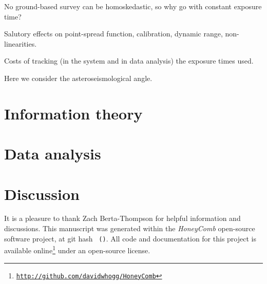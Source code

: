 \documentclass[12pt, preprint]{aastex}
\newcommand{\giturl}{\url{http://github.com/davidwhogg/HoneyComb}}
\newcommand{\project}[1]{\textsl{#1}}
\begin{document}
No ground-based survey can be homoskedastic, so why go with constant exposure time?

Salutory effects on point-spread function, calibration, dynamic range, non-linearities.

Costs of tracking (in the system and in data analysis) the exposure times used.

Here we consider the asteroseismological angle.

\section{Information theory}

\section{Data analysis}

\section{Discussion}

\acknowledgements
It is a pleasure to thank Zach Berta-Thompson for helpful information
and discussions.
This manuscript was generated within the \project{HoneyComb}
open-source software project, at git hash
\texttt{\githash~(\gitdate)}.
All code and documentation for this project is available
online\footnote{\texttt{\giturl}} under an open-source license.
\end{document}
